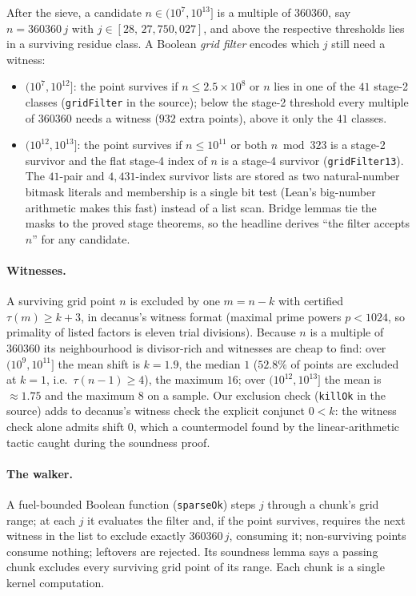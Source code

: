 \documentclass[11pt]{article}
\begin{document}
After the sieve, a candidate $n\in(10^{7},10^{13}]$ is a multiple of $360360$, say $n=360360\,j$ with $j\in[28,\,27{,}750{,}027]$, and above the respective thresholds lies in a surviving residue class. A Boolean \emph{grid filter} encodes which $j$ still need a witness:
\begin{itemize}
\item $(10^{7},10^{12}]$: the point survives if $n\le2.5\times10^{8}$ or $n$ lies in one of the $41$ stage-2 classes (\texttt{gridFilter} in the source); below the stage-2 threshold every multiple of $360360$ needs a witness ($932$ extra points), above it only the $41$ classes.
\item $(10^{12},10^{13}]$: the point survives if $n\le10^{11}$ or both $n\bmod323$ is a stage-2 survivor and the flat stage-4 index of $n$ is a stage-4 survivor (\texttt{gridFilter13}). The $41$-pair and $4{,}431$-index survivor lists are stored as two natural-number bitmask literals and membership is a single bit test (Lean's big-number arithmetic makes this fast) instead of a list scan. Bridge lemmas tie the masks to the proved stage theorems, so the headline derives ``the filter accepts $n$'' for any candidate.
\end{itemize}

\paragraph{Witnesses.} A surviving grid point $n$ is excluded by one $m=n-k$ with certified $\tau(m)\ge k+3$, in decanus's witness format (maximal prime powers $p<1024$, so primality of listed factors is eleven trial divisions). Because $n$ is a multiple of $360360$ its neighbourhood is divisor-rich and witnesses are cheap to find: over $(10^{9},10^{11}]$ the mean shift is $k=1.9$, the median $1$ ($52.8\%$ of points are excluded at $k=1$, i.e.\ $\tau(n-1)\ge4$), the maximum $16$; over $(10^{12},10^{13}]$ the mean is $\approx1.75$ and the maximum $8$ on a sample. Our exclusion check (\texttt{killOk} in the source) adds to decanus's witness check the explicit conjunct $0<k$: the witness check alone admits shift $0$, which a countermodel found by the linear-arithmetic tactic caught during the soundness proof.

\paragraph{The walker.} A fuel-bounded Boolean function (\texttt{sparseOk}) steps $j$ through a chunk's grid range; at each $j$ it evaluates the filter and, if the point survives, requires the next witness in the list to exclude exactly $360360\,j$, consuming it; non-surviving points consume nothing; leftovers are rejected. Its soundness lemma says a passing chunk excludes every surviving grid point of its range. Each chunk is a single kernel computation.
\end{document}

